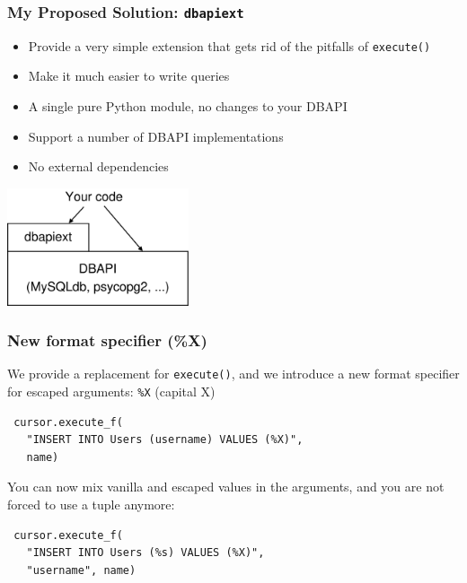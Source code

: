 \documentclass{beamer}
\begin{document}
\begin{frame}[fragile]
  \frametitle{My Proposed Solution: \texttt{dbapiext}}

  \begin{itemize}
  \item Provide a very simple extension that gets rid of the pitfalls of
    \texttt{execute()}
  \item Make it much easier to write queries
  \item A single pure Python module, no changes to your DBAPI
  \item Support a number of DBAPI implementations
  \item No external dependencies
  \end{itemize}

  \begin{center}
    \includegraphics[width=0.4\textwidth]{layer.pdf}
  \end{center}

\end{frame}



\begin{frame}[fragile]
  \frametitle{New format specifier (\%X)}

  We provide a replacement for \texttt{execute()}, and we introduce a new format
  specifier for escaped arguments: \texttt{\%X} (capital X)

\begin{verbatim}
 cursor.execute_f(
   "INSERT INTO Users (username) VALUES (%X)",
   name)
\end{verbatim}

  You can now mix vanilla and escaped values in the arguments, and you are not
  forced to use a tuple anymore:
\begin{verbatim}
 cursor.execute_f(
   "INSERT INTO Users (%s) VALUES (%X)",
   "username", name)
\end{verbatim}

\end{frame}
\end{document}
